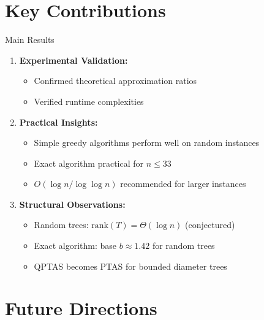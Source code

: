\documentclass[aspectratio=169]{beamer}
\begin{document}
\section{Key Contributions}

\begin{frame}{Main Results}
\begin{enumerate}
    \item \textbf{Experimental Validation:}
    \begin{itemize}
        \item Confirmed theoretical approximation ratios
        \item Verified runtime complexities
    \end{itemize}
    
    \pause
    
    \item \textbf{Practical Insights:}
    \begin{itemize}
        \item Simple greedy algorithms perform well on random instances
        \item Exact algorithm practical for $n \leq 33$
        \item $O(\log n / \log \log n)$ recommended for larger instances
    \end{itemize}
    
    \pause
    
    \item \textbf{Structural Observations:}
    \begin{itemize}
        \item Random trees: $\text{rank}(T) = \Theta(\log n)$ (conjectured)
        \item Exact algorithm: base $b \approx 1.42$ for random trees
        \item QPTAS becomes PTAS for bounded diameter trees
    \end{itemize}
\end{enumerate}
\end{frame}

\section{Future Directions}
\end{document}
